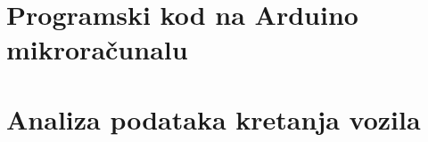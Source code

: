 \documentclass[11pt,a4paper]{report}
\begin{document}





\nocite{*}


\newpage
\appendix
\begin{appendices}\appendix
\chapter{Programski kod na Arduino mikroračunalu}\label{ArduinoSource}

\chapter{Analiza podataka kretanja vozila}\label{AnalizaKretanjaVozila}

\end{appendices}
\end{document}
